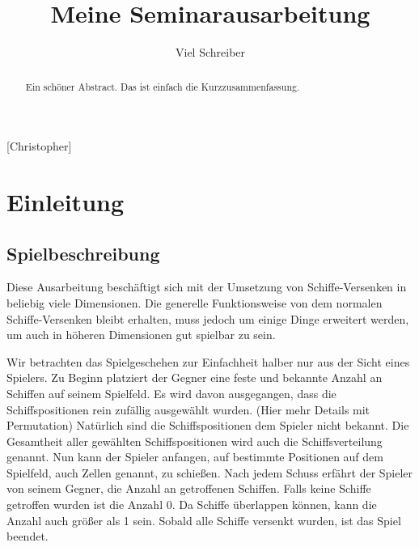 \documentclass[a4paper,12pt]{llncs}
\numberwithin{equation}{section}
\begin{document}

\author{Viel Schreiber}

\title{Meine Seminarausarbeitung}

\maketitle

\thispagestyle{empty}

\begin{abstract}
Ein schöner Abstract. Das ist einfach die Kurzzusammenfassung.
\end{abstract}

[Christopher]

\section{Einleitung}

\subsection{Spielbeschreibung}
Diese Ausarbeitung beschäftigt sich mit der Umsetzung von Schiffe-Versenken in beliebig viele Dimensionen.
Die generelle Funktionsweise von dem normalen Schiffe-Versenken bleibt erhalten, muss jedoch um einige Dinge erweitert werden, um auch in höheren Dimensionen gut spielbar zu sein.

Wir betrachten das Spielgeschehen zur Einfachheit halber nur aus der Sicht eines Spielers.
Zu Beginn platziert der Gegner eine feste und bekannte Anzahl an Schiffen auf seinem Spielfeld. Es wird davon ausgegangen, dass die Schiffspositionen rein zufällig ausgewählt wurden. (Hier mehr Details mit Permutation)
Natürlich sind die Schiffspositionen dem Spieler nicht bekannt.
Die Gesamtheit aller gewählten Schiffspositionen wird auch die Schiffsverteilung genannt.
Nun kann der Spieler anfangen, auf bestimmte Positionen auf dem Spielfeld, auch Zellen genannt, zu schießen.
Nach jedem Schuss erfährt der Spieler von seinem Gegner, die Anzahl an getroffenen Schiffen.
Falls keine Schiffe getroffen wurden ist die Anzahl 0.
Da Schiffe überlappen können, kann die Anzahl auch größer als 1 sein.
Sobald alle Schiffe versenkt wurden, ist das Spiel beendet.
\end{document}
